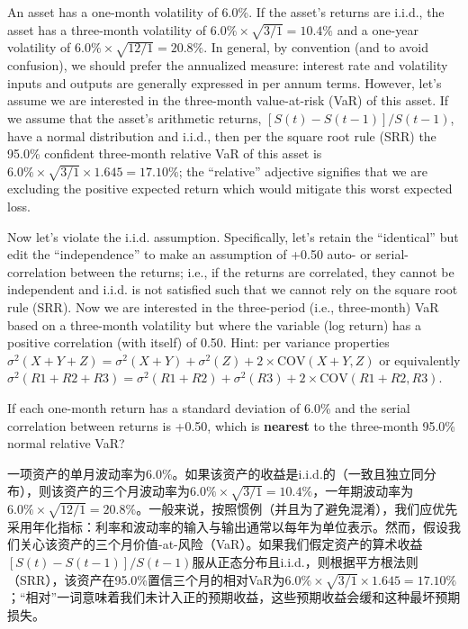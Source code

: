 \documentclass{article}
\newcounter{question} %
\begin{document}
\begin{question}
    An asset has a one-month volatility of 6.0\%. If the asset's returns are i.i.d., the asset has a three-month volatility of $6.0\% \times \sqrt{3/1} = 10.4\%$ and a one-year volatility of $6.0\% \times \sqrt{12/1} = 20.8\%$. In general, by convention (and to avoid confusion), we should prefer the annualized measure: interest rate and volatility inputs and outputs are generally expressed in per annum terms. However, let's assume we are interested in the three-month value-at-risk (VaR) of this asset. If we assume that the asset's arithmetic returns, $[S(t)-S(t-1)]/S(t-1)$, have a normal distribution and i.i.d., then per the square root rule (SRR) the 95.0\% confident three-month relative VaR of this asset is $6.0\% \times \sqrt{3/1} \times 1.645 = 17.10\%$; the ``relative'' adjective signifies that we are excluding the positive expected return which would mitigate this worst expected loss.

    Now let's violate the i.i.d. assumption. Specifically, let's retain the ``identical'' but edit the ``independence'' to make an assumption of +0.50 auto- or serial-correlation between the returns; i.e., if the returns are correlated, they cannot be independent and i.i.d. is not satisfied such that we cannot rely on the square root rule (SRR). Now we are interested in the three-period (i.e., three-month) VaR based on a three-month volatility but where the variable (log return) has a positive correlation (with itself) of 0.50. Hint: per variance properties $\sigma^2(X + Y + Z) = \sigma^2(X + Y) + \sigma^2(Z) + 2 \times \text{COV}(X +Y, Z)$ or equivalently $\sigma^2(R1 + R2 + R3) = \sigma^2(R1 + R2) + \sigma^2(R3) + 2 \times \text{COV}(R1 +R2, R3)$.

    If each one-month return has a standard deviation of 6.0\% and the serial correlation between returns is +0.50, which is \textbf{nearest} to the three-month 95.0\% normal relative VaR?

    一项资产的单月波动率为6.0\%。如果该资产的收益是i.i.d.的（一致且独立同分布），则该资产的三个月波动率为$6.0\% \times \sqrt{3/1} = 10.4\%$，一年期波动率为$6.0\% \times \sqrt{12/1} = 20.8\%$。一般来说，按照惯例（并且为了避免混淆），我们应优先采用年化指标：利率和波动率的输入与输出通常以每年为单位表示。然而，假设我们关心该资产的三个月价值-at-风险（VaR）。如果我们假定资产的算术收益$[S(t)-S(t-1)]/S(t-1)$服从正态分布且i.i.d.，则根据平方根法则（SRR），该资产在95.0\%置信三个月的相对VaR为$6.0\% \times \sqrt{3/1} \times 1.645 = 17.10\%$；“相对”一词意味着我们未计入正的预期收益，这些预期收益会缓和这种最坏预期损失。


\end{question}
\end{document}
